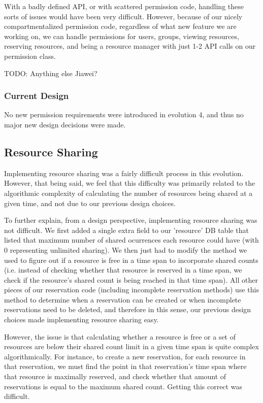 \documentclass[12pt]{article}
\begin{document}
With a badly defined API, or with scattered permission code, handling these sorts of issues would have been very difficult. However, because of our nicely compartmentalized permission code, regardless of what new feature we are working on, we can handle permissions for users, groups, viewing resources, reserving resources, and being a resource manager with just 1-2 API calls on our permission class. 

TODO: Anything else Jiawei?

\subsubsection{Current Design}
No new permission requirements were introduced in evolution 4, and thus no major new design decisions were made. 


\subsection{Resource Sharing}
Implementing resource sharing was a fairly difficult process in this evolution. However, that being said, we feel that this difficulty was primarily related to the algorithmic complexity of calculating the number of resources being shared at a given time, and not due to our previous design choices. 

To further explain, from a design perspective, implementing resource sharing was not difficult. We first added a single extra field to our 'resource' DB table that listed that maximum number of shared ocurrences each resource could have (with 0 representing unlimited sharing). We then just had to modify the method we used to figure out if a resource is free in a time span to incorporate shared counts (i.e. instead of checking whether that resource is reserved in a time span, we check if the resource's shared count is being reached in that time span). All other pieces of our reservation code (including incomplete reservation methods) use this method to determine when a reservation can be created or when incomplete reservations need to be deleted, and therefore in this sense, our previous design choices made implementing resource sharing easy. 

However, the issue is that calculating whether a resource is free or a set of resources are below their shared count limit in a given time span is quite complex algorithmically. For instance, to create a new reservation, for each resource in that reservation, we must find the point in that reservation's time span where that resource is maximally reserved, and check whether that amount of reservations is equal to the maximum shared count. Getting this correct was difficult. 
\end{document}
